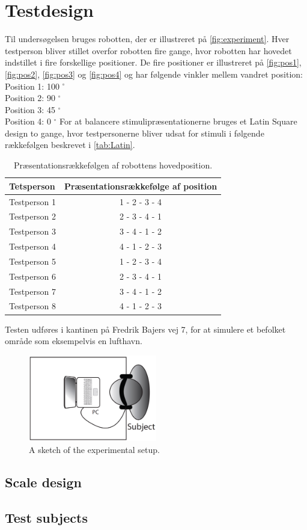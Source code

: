 \section*{Testdesign}
%
Til undersøgelsen bruges robotten, der er illustreret på \autoref{fig:experiment}. Hver testperson bliver stillet overfor robotten fire gange, hvor robotten har hovedet indstillet i fire forskellige positioner. De fire positioner er illustreret på \autoref{fig:pos1}, \autoref{fig:pos2}, \autoref{fig:pos3} og \autoref{fig:pos4} og har følgende vinkler mellem vandret position:\blankline
%
Position 1: 100 $^{\circ}$\\
Position 2: 90 $^{\circ}$\\
Position 3: 45 $^{\circ}$\\
Position 4: 0 $^{\circ}$\blankline
%
For at balancere stimulipræsentationerne bruges et Latin Square design to gange, hvor testpersonerne bliver udsat for stimuli i følgende rækkefølgen beskrevet i \autoref{tab:Latin}.\blankline
%
\begin{table}[H]
	\centering
	\begin{tabular}{l|c}
		Tetsperson     & Præsentationsrækkefølge af position \\\hline
		Testperson 1   & 1 - 2 - 3 - 4          \\\hline
		Testperson 2   & 2 - 3 - 4 - 1          \\\hline
		Testperson 3   & 3 - 4 - 1 - 2          \\\hline
		Testperson 4   & 4 - 1 - 2 - 3          \\\hline
		Testperson 5   & 1 - 2 - 3 - 4          \\\hline
		Testperson 6   & 2 - 3 - 4 - 1          \\\hline
		Testperson 7   & 3 - 4 - 1 - 2          \\\hline
		Testperson 8   & 4 - 1 - 2 - 3   
	\end{tabular}
	\caption{Præsentationsrækkefølgen af robottens hovedposition.}
	\label{tab:Latin}         
\end{table}
\noindent
%
Testen udføres i kantinen på Fredrik Bajers vej 7, for at simulere et befolket område som eksempelvis en lufthavn. 



%
\begin{figure}[H]
\centering
\includegraphics[width = 0.5\textwidth]{Figure/experiment.png} 
\caption{A sketch of the experimental setup.}
\label{fig:experiment}
\end{figure}
%
\subsection*{Scale design}

\subsection*{Test subjects}
